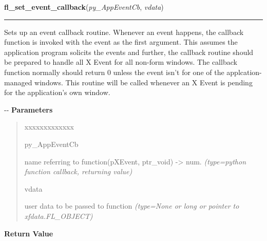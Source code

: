     \label{xformslib:flxbasic:fl_set_event_callback}

    \vspace{0.5ex}

\hspace{.8\funcindent}\begin{boxedminipage}{\funcwidth}

    \raggedright \textbf{fl\_set\_event\_callback}(\textit{py\_AppEventCb}, \textit{vdata})

    \vspace{-1.5ex}

    \rule{\textwidth}{0.5\fboxrule}
\setlength{\parskip}{2ex}

Sets up an event callback routine. Whenever an event happens, the
callback function is invoked with the event as the first argument.
This assumes the application program solicits the events and further,
the callback routine should be prepared to handle all X Event for all
non-form windows. The callback function normally should return 0
unless the event isn't for one of the applcation-managed windows.
This routine will be called whenever an X Event is pending for the
application's own window.

-{}-
\setlength{\parskip}{1ex}
      \textbf{Parameters}
      \vspace{-1ex}

      \begin{quote}
        \begin{Ventry}{xxxxxxxxxxxxx}

          \item[py\_AppEventCb]


name referring to function(pXEvent, ptr\_void) -> num.
            {\it (type=python function callback, returning value)}

          \item[vdata]


user data to be passed to function
            {\it (type=None or long or pointer to xfdata.FL\_OBJECT)}

        \end{Ventry}

      \end{quote}

      \textbf{Return Value}
    \vspace{-1ex}

      \begin{quote}


\end{quote}
\end{boxedminipage}

